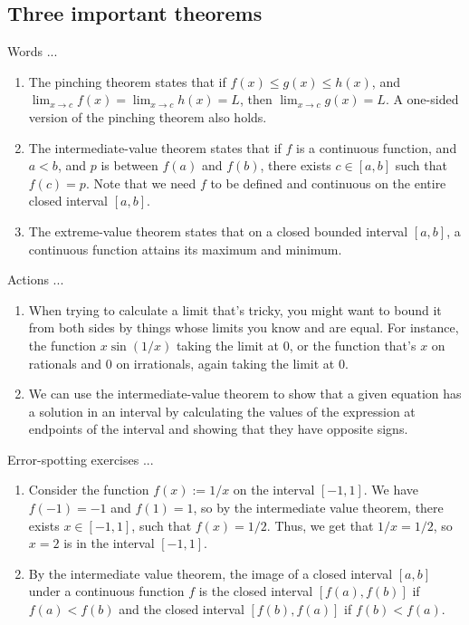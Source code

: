 \documentclass[10pt]{amsart}
\begin{document}
\subsection{Three important theorems}

Words ...

\begin{enumerate}
\item The pinching theorem states that if $f(x) \le g(x) \le h(x)$,
  and $\lim_{x \to c} f(x) = \lim_{x \to c} h(x) = L$, then $\lim_{x
  \to c} g(x) = L$. A one-sided version of the pinching theorem also
  holds.
\item The intermediate-value theorem states that if $f$ is a
  continuous function, and $a < b$, and $p$ is between $f(a)$ and
  $f(b)$, there exists $c \in [a,b]$ such that $f(c) = p$. Note that
  we need $f$ to be defined and continuous on the entire closed
  interval $[a,b]$.
\item The extreme-value theorem states that on a closed bounded
  interval $[a,b]$, a continuous function attains its maximum and
  minimum.
\end{enumerate}

Actions ...

\begin{enumerate}
\item When trying to calculate a limit that's tricky, you might want
  to bound it from both sides by things whose limits you know and are
  equal. For instance, the function $x \sin (1/x)$ taking the limit at
  $0$, or the function that's $x$ on rationals and $0$ on irrationals,
  again taking the limit at $0$.
\item We can use the intermediate-value theorem to show that a given
  equation has a solution in an interval by calculating the values of
  the expression at endpoints of the interval and showing that they
  have opposite signs.
\end{enumerate}

Error-spotting exercises ...

\begin{enumerate}
\item Consider the function $f(x) := 1/x$ on the interval $[-1,1]$. We
  have $f(-1) = -1$ and $f(1) = 1$, so by the intermediate value
  theorem, there exists $x \in [-1,1]$, such that $f(x) = 1/2$. Thus,
  we get that $1/x = 1/2$, so $x = 2$ is in the interval $[-1,1]$.
\item By the intermediate value theorem, the image of a closed
  interval $[a,b]$ under a continuous function $f$ is the closed
  interval $[f(a),f(b)]$ if $f(a) < f(b)$ and the closed interval
  $[f(b),f(a)]$ if $f(b) < f(a)$.
\end{enumerate}
\end{document}
